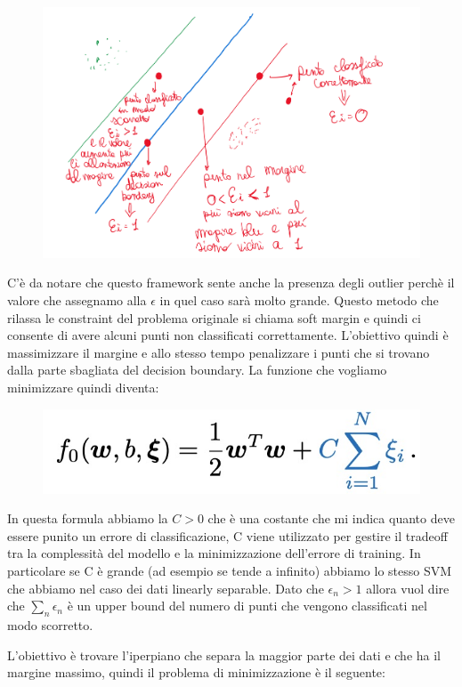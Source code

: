 \documentclass[14pt]{extreport}
\begin{document}
\begin{figure}[H]
	\centering
	\includegraphics[width=0.7\linewidth]{567.jpeg}
\end{figure}

C'è da notare che questo framework sente anche la presenza degli outlier perchè il valore che assegnamo alla $\epsilon$ in quel caso sarà molto
grande. Questo metodo che rilassa le constraint del problema originale si chiama soft margin e quindi ci consente di avere alcuni punti non
classificati correttamente. L'obiettivo quindi è massimizzare il margine e allo stesso tempo penalizzare i punti che si trovano dalla parte sbagliata
del decision boundary. La funzione che vogliamo minimizzare quindi diventa:

\begin{figure}[H]
	\centering
	\includegraphics[width=0.7\linewidth]{323.jpeg}
\end{figure}

In questa formula abbiamo la $C>0$ che è una costante che mi indica quanto deve essere punito un errore di classificazione, C viene utilizzato per
gestire il tradeoff tra la complessità del modello e la minimizzazione dell'errore di training. In particolare se C è grande (ad esempio se tende a
infinito) abbiamo lo stesso SVM che abbiamo nel caso dei dati linearly separable. Dato che $\epsilon_n > 1$ allora vuol dire che $\sum_n\epsilon_n$ è
un upper bound del numero di punti che vengono classificati nel modo scorretto.

L'obiettivo è trovare l'iperpiano che separa la maggior parte dei dati e che ha il margine massimo, quindi il problema di minimizzazione è il
seguente:
\end{document}
